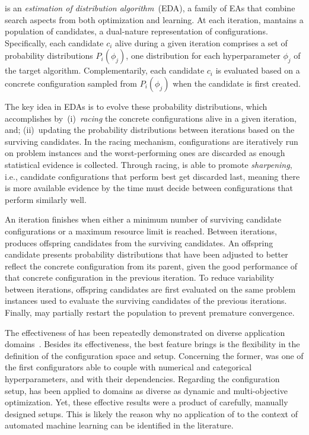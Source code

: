\irace is an \emph{estimation of distribution algorithm}~(EDA), a family of EAs that  
combine search aspects from both optimization and learning. At each iteration, \irace mantains a population of candidates, a dual-nature representation of configurations. Specifically, each candidate $c_i$ alive during a given iteration comprises a set of probability distributions $P_i(\phi_j)$, one distribution for each hyperparameter $\phi_j$ of the target algorithm. Complementarily, each candidate $c_i$ is evaluated based on a concrete configuration sampled from $P_i(\phi_j)$ when the candidate is first created. 

The key idea in EDAs is to evolve these probability distributions, which \irace accomplishes by~(i)~\emph{racing} the concrete configurations alive in a given iteration, and; (ii)~updating the probability distributions between iterations based on the surviving candidates. In the racing mechanism, configurations are iteratively run on problem instances and the worst-performing ones are discarded as enough statistical evidence is collected. Through racing, \irace is able to promote \emph{sharpening}, i.e., candidate configurations that perform best get discarded last, meaning there is more available evidence by the time \irace must decide between configurations that perform similarly well.%

An iteration finishes when either a minimum number of surviving candidate configurations or a maximum resource limit is reached. Between iterations, \irace produces offspring candidates from the surviving candidates. An offspring candidate presents probability distributions that have been adjusted to better reflect the concrete configuration from its parent, given the good performance of that concrete configuration in the previous iteration. To reduce variability between iterations, offspring candidates are first evaluated on the same problem instances used to evaluate the surviving candidates of the previous iterations. Finally, \irace may partially restart the population to prevent premature convergence. %

The effectiveness of \irace has been repeatedly demonstrated on diverse application domains~\cite{BezerraPhD}. Besides its effectiveness, the best feature \irace brings is the flexibility in the definition of the configuration space and setup. Concerning the former, \irace was one of the first configurators able to couple with numerical and categorical hyperparameters, and with their dependencies. Regarding the configuration setup, \irace has been applied to domains as diverse as dynamic and multi-objective optimization. Yet, these effective results were a product of carefully, manually designed setups. This is likely the reason why no application of \irace to the context of automated machine learning can be identified in the literature.%

